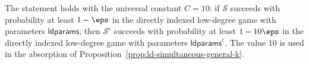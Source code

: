 \begin{lemma}
	\label{lem:ld-combined-value}
	\leanok
	The statement holds with the universal constant $C = 10$: if $\mathcal S$
	succeeds with probability at least $1 - \eps$ in the directly indexed
	low-degree game with parameters $\mathsf{ldparams}$, then
	$\mathcal S^{\mathrm c}$ succeeds with probability at least $1 - 10\eps$ in
	the directly indexed low-degree game with parameters
	$\mathsf{ldparams}^{\mathrm c}$.  The value $10$ is used in the absorption of
	Proposition~\ref{prop:ld-simultaneous-general-k}.
\end{lemma}
